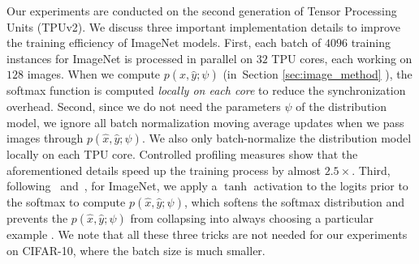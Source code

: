Our experiments are conducted on the second generation of Tensor Processing Units (TPUv2). We discuss three important implementation details to improve the training efficiency of ImageNet models. First, each batch of $4096$ training instances for ImageNet is processed in parallel on $32$ TPU cores, each working on $128$ images. When we compute $p(\hat{x}, \hat{y}; \psi)$ (in~Section \ref{sec:image_method} ), the softmax function is computed \textit{locally on each core} to reduce the synchronization overhead. Second, since we do not need the parameters $\psi$ of the distribution model, we ignore all batch normalization moving average updates when we pass images through $p(\hat{x}, \hat{y}; \psi)$. We also only batch-normalize the distribution model locally on each TPU core. Controlled profiling measures show that the aforementioned details speed up the training process by almost $2.5 \times$. Third, following~\citet{neural_combi} and~\citet{enas}, for ImageNet, we apply a $\tanh$ activation to the logits prior to the softmax to compute $p(\hat{x}, \hat{y}; \psi)$, which softens the softmax distribution and prevents the $p(\hat{x}, \hat{y}; \psi)$ from collapsing into always choosing a particular example . We note that all these three tricks are not needed for our experiments on CIFAR-10, where the batch size is much smaller.


